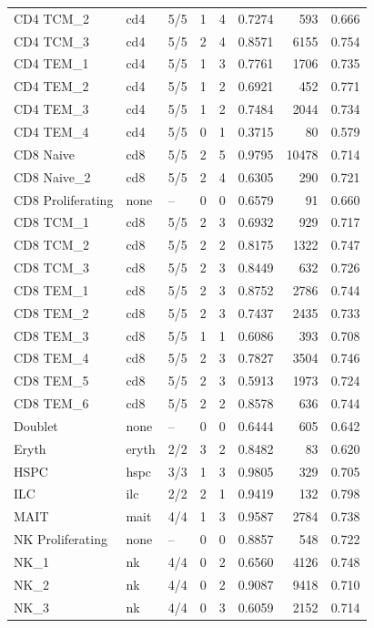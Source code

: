 \begin{longtable}{@{}p{2.2cm}p{1.0cm}p{0.9cm}rrrrr@{}}
CD4 TCM\_2 & cd4 & 5/5 & 1 & 4 & 0.7274 & 593 & 0.666 \\
CD4 TCM\_3 & cd4 & 5/5 & 2 & 4 & 0.8571 & 6155 & 0.754 \\
CD4 TEM\_1 & cd4 & 5/5 & 1 & 3 & 0.7761 & 1706 & 0.735 \\
CD4 TEM\_2 & cd4 & 5/5 & 1 & 2 & 0.6921 & 452 & 0.771 \\
CD4 TEM\_3 & cd4 & 5/5 & 1 & 2 & 0.7484 & 2044 & 0.734 \\
CD4 TEM\_4 & cd4 & 5/5 & 0 & 1 & 0.3715 & 80 & 0.579 \\
CD8 Naive & cd8 & 5/5 & 2 & 5 & 0.9795 & 10478 & 0.714 \\
CD8 Naive\_2 & cd8 & 5/5 & 2 & 4 & 0.6305 & 290 & 0.721 \\
CD8 Proliferating & none & -- & 0 & 0 & 0.6579 & 91 & 0.660 \\
CD8 TCM\_1 & cd8 & 5/5 & 2 & 3 & 0.6932 & 929 & 0.717 \\
CD8 TCM\_2 & cd8 & 5/5 & 2 & 2 & 0.8175 & 1322 & 0.747 \\
CD8 TCM\_3 & cd8 & 5/5 & 2 & 3 & 0.8449 & 632 & 0.726 \\
CD8 TEM\_1 & cd8 & 5/5 & 2 & 3 & 0.8752 & 2786 & 0.744 \\
CD8 TEM\_2 & cd8 & 5/5 & 2 & 3 & 0.7437 & 2435 & 0.733 \\
CD8 TEM\_3 & cd8 & 5/5 & 1 & 1 & 0.6086 & 393 & 0.708 \\
CD8 TEM\_4 & cd8 & 5/5 & 2 & 3 & 0.7827 & 3504 & 0.746 \\
CD8 TEM\_5 & cd8 & 5/5 & 2 & 3 & 0.5913 & 1973 & 0.724 \\
CD8 TEM\_6 & cd8 & 5/5 & 2 & 2 & 0.8578 & 636 & 0.744 \\
Doublet & none & -- & 0 & 0 & 0.6444 & 605 & 0.642 \\
Eryth & eryth & 2/2 & 3 & 2 & 0.8482 & 83 & 0.620 \\
HSPC & hspc & 3/3 & 1 & 3 & 0.9805 & 329 & 0.705 \\
ILC & ilc & 2/2 & 2 & 1 & 0.9419 & 132 & 0.798 \\
MAIT & mait & 4/4 & 1 & 3 & 0.9587 & 2784 & 0.738 \\
NK Proliferating & none & -- & 0 & 0 & 0.8857 & 548 & 0.722 \\
NK\_1 & nk & 4/4 & 0 & 2 & 0.6560 & 4126 & 0.748 \\
NK\_2 & nk & 4/4 & 0 & 2 & 0.9087 & 9418 & 0.710 \\
NK\_3 & nk & 4/4 & 0 & 3 & 0.6059 & 2152 & 0.714 \\

\end{longtable}

